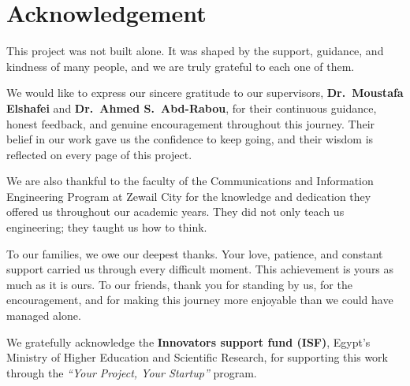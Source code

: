 \documentclass[12pt,a4paper]{report}
\begin{document}
\setcounter{page}{1}
\tableofcontents

\chapter*{Acknowledgement}

This project was not built alone. It was shaped by the support, guidance, and kindness
of many people, and we are truly grateful to each one of them.

\par\vspace{0.5cm}

We would like to express our sincere gratitude to our supervisors, \textbf{Dr.\ Moustafa
Elshafei} and \textbf{Dr.\ Ahmed S.\ Abd-Rabou}, for their continuous guidance, honest
feedback, and genuine encouragement throughout this journey. Their belief in our work
gave us the confidence to keep going, and their wisdom is reflected on every page of
this project.

\par\vspace{0.5cm}

We are also thankful to the faculty of the Communications and Information Engineering
Program at Zewail City for the knowledge and dedication they offered us throughout our
academic years. They did not only teach us engineering; they taught us how to think.

\par\vspace{0.5cm}

To our families, we owe our deepest thanks. Your love, patience, and constant support
carried us through every difficult moment. This achievement is yours as much as it is
ours. To our friends, thank you for standing by us, for the encouragement, and for
making this journey more enjoyable than we could have managed alone.

\par\vspace{0.5cm}

We gratefully acknowledge the \textbf{Innovators support fund (ISF)}, Egypt's
Ministry of Higher Education and Scientific Research, for supporting this work through
the \textit{``Your Project, Your Startup''} program. 
\end{document}
